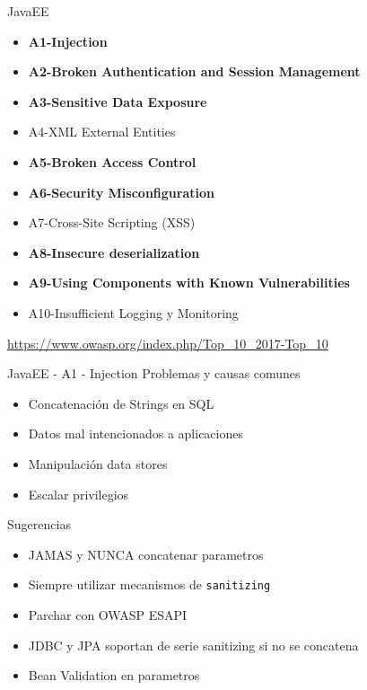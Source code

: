 \documentclass{beamer}
\begin{document}
\begin{frame}{JavaEE}
\begin{itemize}
\item \textbf{A1-Injection}
\item \textbf{A2-Broken Authentication and Session Management}
\item \textbf{A3-Sensitive Data Exposure}
\item A4-XML External Entities
\item \textbf{A5-Broken Access Control}
\item \textbf{A6-Security Misconfiguration}
\item A7-Cross-Site Scripting (XSS)
\item \textbf{A8-Insecure deserialization}
\item \textbf{A9-Using Components with Known Vulnerabilities}
\item A10-Insufficient Logging y Monitoring
\end{itemize}
\url{https://www.owasp.org/index.php/Top_10_2017-Top_10}
\end{frame}


\begin{frame}{JavaEE - A1 - Injection}
Problemas y causas comunes
\begin{itemize}
	\item Concatenación de Strings en SQL
	\item Datos mal intencionados a aplicaciones
	\item Manipulación data stores
	\item Escalar privilegios
\end{itemize}

Sugerencias
\begin{itemize}
	\item JAMAS y NUNCA concatenar parametros
	\item Siempre utilizar mecanismos de \texttt{sanitizing}
	\item Parchar con OWASP ESAPI
	\item JDBC y JPA soportan de serie sanitizing si no se concatena
	\item Bean Validation en parametros
\end{itemize}
\end{frame}
\end{document}

